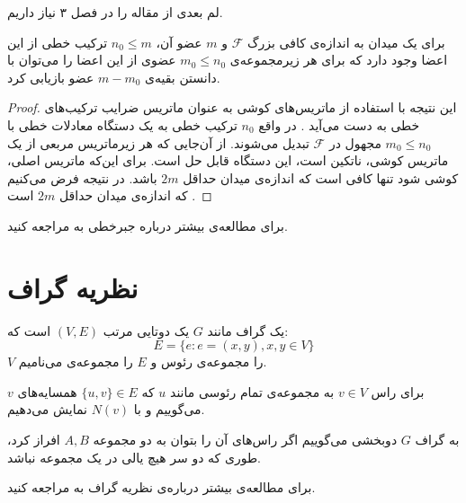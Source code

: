 لم بعدی از مقاله
\cite{pliable2015paper}
را در فصل ۳ نیاز داریم.
\begin{lemma}
	\label{lemma:pliable20151}
	برای یک میدان به اندازه‌ی کافی بزرگ
	$\mathcal{F}$
	و
	$m$
	عضو آن،
	$n_0 \leq m$
	ترکیب خطی از این اعضا وجود دارد که برای هر زیرمجموعه‌ی
	$m_0 \leq n_0$
	عضوی از این اعضا را می‌توان با دانستن بقیه‌ی
	$m - m_0$
	عضو بازیابی کرد.
\end{lemma}
\begin{proof}
این نتیجه با استفاده از ماتریس‌های کوشی به عنوان ماتریس ضرایب ترکیب‌های خطی به دست می‌آید
\cite{Blmer1995AnXE}.
در واقع
$n_0$
ترکیب خطی به یک دستگاه معادلات خطی با
$m_0 \leq n_0$
مجهول در
$\mathcal{F}$
تبدیل می‌شوند. از آن‌جایی که هر زیرماتریس مربعی از یک ماتریس کوشی، ناتکین است، این دستگاه قابل حل است. برای این‌که ماتریس اصلی، کوشی شود تنها کافی است که اندازه‌ی میدان حداقل
$2m$
باشد. در نتیجه فرض می‌کنیم که اندازه‌ی میدان حداقل
$2m$
است
\cite{pliable2015paper}.
\end{proof}
	برای مطالعه‌ی بیشتر درباره جبرخطی به
\cite{sheldon}
مراجعه کنید.
\section{نظریه گراف}
\begin{definition}[گراف]
یک گراف مانند
$G$
یک دوتایی مرتب
$(V, E)$
است که:
$$E = \{e: e = (x, y), x, y \in V\}$$
 $V$
را مجموعه‌ی رئوس و
$E$
را مجموعه‌ی 
می‌نامیم.
\end{definition}
\begin{definition}[همسایه]
برای راس
$v\in V$
به مجمو‌عه‌ی تمام رئوسی مانند
  $u$ 
  که
  $\{u,v\}\in E$ 
  همسایه‌های 
  $v$
  می‌گوییم و با
  $N(v)$
  نمایش می‌دهیم.
  \end{definition}
  \begin{definition}
  
به گراف
$G$
دوبخشی می‌گوییم اگر راس‌های آن را بتوان به دو مجموعه 
$A, B$
افراز کرد، طوری که دو سر هیچ یالی در یک مجموعه نباشد.
\end{definition}
	برای مطالعه‌ی بیشتر درباره‌ی نظریه گراف به
\cite{west}
مراجعه کنید.

